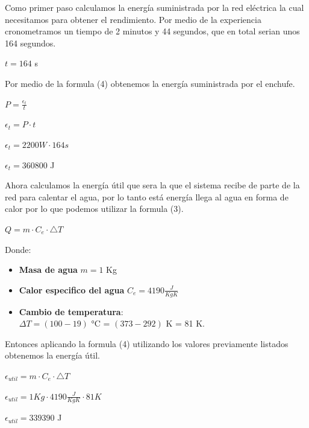 \documentclass[]{article}
\begin{document}
\begin{flushleft}
	Como primer paso calculamos la energía suministrada por la red eléctrica la cual necesitamos para obtener el rendimiento. Por medio de la experiencia cronometramos un tiempo de 2 minutos y 44 segundos, que en total serian unos 164 segundos.
	
	\begin{center}
		$t = 164$ s
	\end{center}
	
	Por medio de la formula (4) obtenemos la energía suministrada por el enchufe.
	
	\begin{center}
		$P = \frac{\epsilon_{t}}{t}$
	\end{center}
	\begin{center}
		$\epsilon_{t} = P \cdot t$
	\end{center}
	\begin{center}
		$\epsilon_{t} = 2200 W \cdot 164 s$
	\end{center}
	\begin{center}
		$\epsilon_{t} = 360800$ J
	\end{center}
\end{flushleft}

\begin{flushleft}
	Ahora calculamos la energía útil que sera la que el sistema recibe de parte de la red para calentar el agua, por lo tanto está energía llega al agua en forma de calor por lo que podemos utilizar la formula (3).
	
	\begin{center}
		$Q = m \cdot C_{e} \cdot \bigtriangleup T$
	\end{center}
	
	Donde:
	\begin{itemize}
		\item \textbf{Masa de agua} $m = 1$ Kg
		\item \textbf{Calor especifico del agua} $C_{e} = 4190 \frac{J}{KgK}$ 
		\item \textbf{Cambio de temperatura}: \\
		$\Delta T = (100 - 19)$ °C = $(373 - 292)$ K = 81 K.
	\end{itemize}
	
	\begin{flushleft}
		Entonces aplicando la formula (4) utilizando los valores previamente listados obtenemos la energía útil.
	\end{flushleft}
	
	\begin{center}
		$\epsilon_{util} = m \cdot C_{e} \cdot \bigtriangleup T$
	\end{center}
	\begin{center}
		$\epsilon_{util} = 1 Kg \cdot 4190 \frac{J}{KgK} \cdot 81 K$
	\end{center}
	
	\begin{center}
		$\epsilon_{util} = 339390$ J
	\end{center}
\end{flushleft}
\end{document}
